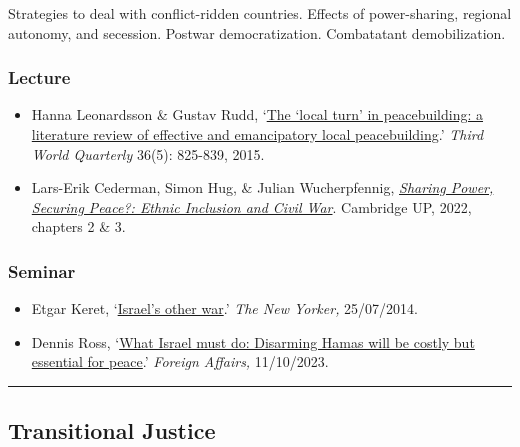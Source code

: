 \documentclass[12pt, a4paper]{article}
\begin{document}
Strategies to deal with conflict-ridden countries. Effects of power-sharing, regional autonomy, and secession. Postwar democratization. Combatatant demobilization.

\subsubsection*{Lecture}

\begin{itemize}
\setlength\itemsep{0pt}
\item Hanna Leonardsson \& Gustav Rudd, `\href{https://doi.org/10.1080/01436597.2015.1029905}{The ‘local turn’ in peacebuilding: a literature review of effective and emancipatory local peacebuilding}.' \textit{Third World Quarterly} 36(5): 825-839, 2015.
\item Lars-Erik Cederman, Simon Hug, \& Julian Wucherpfennig, \href{https://doi.org/10.1017/9781108284639}{\textit{Sharing Power, Securing Peace?: Ethnic Inclusion and Civil War}}. Cambridge UP, 2022, chapters 2 \& 3.
\end{itemize}

\subsubsection*{Seminar}

\begin{itemize}
\setlength\itemsep{0pt}
\item Etgar Keret, `\href{https://www.newyorker.com/books/page-turner/israels-other-war}{Israel's other war}.' \textit{The New Yorker,} 25/07/2014.
\item Dennis Ross, `\href{https://www.foreignaffairs.com/israel/hamas-what-israel-must-do}{What Israel must do: Disarming Hamas will be costly but essential for peace}.' \textit{Foreign Affairs,} 11/10/2023.
\end{itemize}


\hrule %

\subsection{Transitional Justice}\label{tj}
\end{document}
